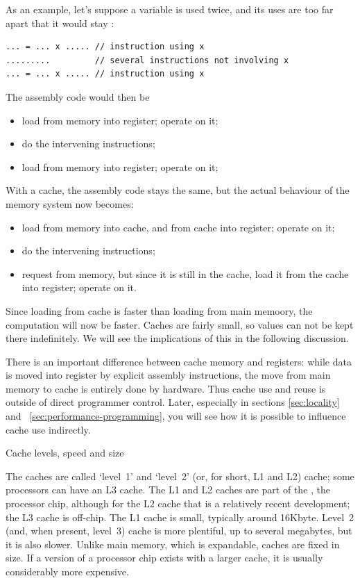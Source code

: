 As an example, let's suppose a variable  is used twice, and its
uses are too far apart that it would stay :
\begin{verbatim}
... = ... x ..... // instruction using x
.........         // several instructions not involving x
... = ... x ..... // instruction using x
\end{verbatim}
The assembly code would then be
\begin{itemize}
\item load  from memory into register; operate on it;
\item do the intervening instructions;
\item load  from memory into register; operate on it;
\end{itemize}
With a cache, the assembly code stays the same, but the actual
behaviour of the memory system now becomes:
\begin{itemize}
\item load  from memory into cache, and from cache into register;
  operate on it;
\item do the intervening instructions;
\item request  from memory, but since it is still in the cache,
  load it from the cache into register; operate on it.
\end{itemize}
Since loading from cache is faster than loading from main memoory, the
computation will now be faster. Caches are fairly small, so values
can not be kept there indefinitely. We will see the implications of
this in the following discussion.

There is an important difference between cache memory and registers:
while data is moved into register by explicit assembly instructions,
the move from main memory to cache is entirely done by hardware.  Thus
cache use and reuse is outside of direct programmer control. Later,
especially in sections \ref{sec:locality} and
~\ref{sec:performance-programming}, you will see how it is possible to
influence cache use indirectly.

 {Cache levels, speed and size}

The caches are called `level~1' and `level~2' (or, for short, L1 and
L2) cache; some processors can have an L3 cache.  The L1 and L2 caches
are part of the , the processor chip, although for the
L2 cache that is a relatively recent development; the L3 cache is
off-chip.  The L1 cache is small, typically around 16Kbyte. Level~2
(and, when present, level~3) cache is more plentiful, up to several
megabytes, but it is also slower.  Unlike main memory, which is
expandable, caches are fixed in size. If a version of a processor chip
exists with a larger cache, it is usually considerably more expensive.

